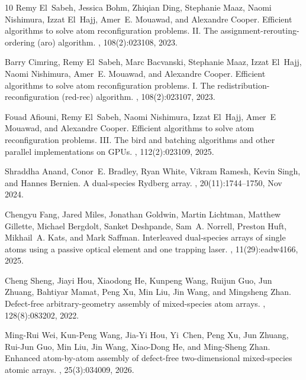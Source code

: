 \documentclass[a4paper,USenglish,thm-restate]{lipics-v2021}
\theoremstyle{problemstyle}
\begin{document}
\begin{thebibliography}{10}
Remy El~Sabeh, Jessica Bohm, Zhiqian Ding, Stephanie Maaz, Naomi Nishimura,
  Izzat El~Hajj, Amer~E. Mouawad, and Alexandre Cooper.
\newblock Efficient algorithms to solve atom reconfiguration problems. {II.}
  {The} assignment-rerouting-ordering (aro) algorithm.
, 108(2):023108, 2023.

Barry Cimring, Remy El~Sabeh, Marc Bacvanski, Stephanie Maaz, Izzat El~Hajj,
  Naomi Nishimura, Amer~E. Mouawad, and Alexandre Cooper.
\newblock Efficient algorithms to solve atom reconfiguration problems. {I.}
  {The} redistribution-reconfiguration (red-rec) algorithm.
, 108(2):023107, 2023.

Fouad Afiouni, Remy El~Sabeh, Naomi Nishimura, Izzat El~Hajj, Amer~E Mouawad,
  and Alexandre Cooper.
\newblock Efficient algorithms to solve atom reconfiguration problems. {III.
  The bird} and batching algorithms and other parallel implementations on
  {GPUs}.
, 112(2):023109, 2025.

Shraddha Anand, Conor~E. Bradley, Ryan White, Vikram Ramesh, Kevin Singh, and
  Hannes Bernien.
\newblock A dual-species {R}ydberg array.
, 20(11):1744--1750, Nov 2024.

Chengyu Fang, Jared Miles, Jonathan Goldwin, Martin Lichtman, Matthew Gillette,
  Michael Bergdolt, Sanket Deshpande, Sam~A. Norrell, Preston Huft, Mikhail~A.
  Kats, and Mark Saffman.
\newblock Interleaved dual-species arrays of single atoms using a passive
  optical element and one trapping laser.
, 11(29):eadw4166, 2025.

Cheng Sheng, Jiayi Hou, Xiaodong He, Kunpeng Wang, Ruijun Guo, Jun Zhuang,
  Bahtiyar Mamat, Peng Xu, Min Liu, Jin Wang, and Mingsheng Zhan.
\newblock Defect-free arbitrary-geometry assembly of mixed-species atom arrays.
, 128(8):083202, 2022.

Ming-Rui Wei, Kun-Peng Wang, Jia-Yi Hou, Yi~Chen, Peng Xu, Jun Zhuang, Rui-Jun
  Guo, Min Liu, Jin Wang, Xiao-Dong He, and Ming-Sheng Zhan.
\newblock Enhanced atom-by-atom assembly of defect-free two-dimensional
  mixed-species atomic arrays.
, 25(3):034009, 2026.


\end{thebibliography}
\end{document}
